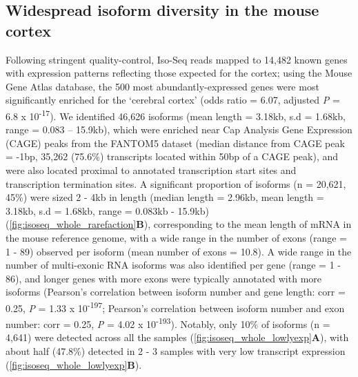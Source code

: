\subsection{Widespread isoform diversity in the mouse cortex}
Following stringent quality-control, Iso-Seq reads mapped to 14,482 known genes with expression patterns reflecting those expected for the cortex; using the Mouse Gene Atlas database, the 500 most abundantly-expressed genes were most significantly enriched for the ‘cerebral cortex’ (odds ratio = 6.07, adjusted \textit{P} = 6.8 x 10\textsuperscript{-17}). We identified 46,626 isoforms (mean length = 3.18kb, s.d = 1.68kb, range = 0.083 – 15.9kb), which were enriched near Cap Analysis Gene Expression (CAGE) peaks from the FANTOM5 dataset (median distance from CAGE peak = -1bp, 35,262 (75.6\%) transcripts located within 50bp of a CAGE peak), and were also located proximal to annotated transcription start sites and transcription termination sites. A significant proportion of isoforms (n = 20,621, 45\%) were sized 2 - 4kb in length (median length = 2.96kb, mean length = 3.18kb, s.d = 1.68kb, range = 0.083kb - 15.9kb) (\cref{fig:isoseq_whole_rarefaction}\textbf{B}), corresponding to the mean length of mRNA in the mouse reference genome, with a wide range in the number of exons (range = 1 - 89) observed per isoform (mean number of exons = 10.8). A wide range in the number of multi-exonic RNA isoforms was also identified per gene (range = 1 - 86), and longer genes with more exons were typically annotated with more isoforms (Pearson's correlation between isoform number and gene length: corr = 0.25, \textit{P} = 1.33 x 10\textsuperscript{-197}; Pearson's correlation between isoform number and exon number: corr = 0.25, \textit{P} = 4.02 x 10\textsuperscript{-193}). Notably, only 10\% of isoforms (n = 4,641) were detected across all the samples (\cref{fig:isoseq_whole_lowlyexp}\textbf{A}), with about half (47.8\%) detected in 2 - 3 samples with very low transcript expression (\cref{fig:isoseq_whole_lowlyexp}\textbf{B}). 

